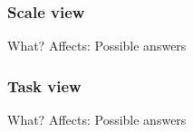 \begin{frame}
\frametitle{Scale view}
What?
Affects:
Possible answers
\end{frame}

\begin{frame}
\frametitle{Task view}
What?
Affects:
Possible answers
\end{frame}
